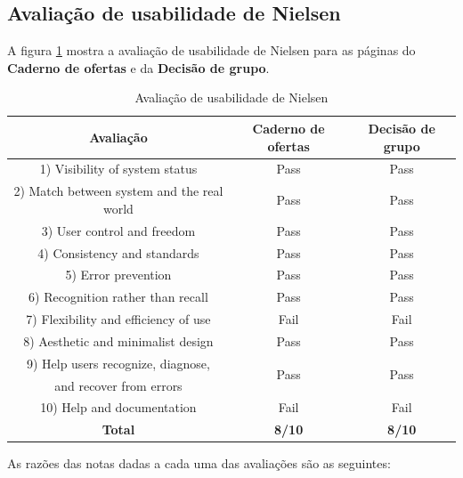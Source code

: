 \subsection{Avaliação de usabilidade de Nielsen}
A figura \ref{tab:NielCad} mostra a avaliação de usabilidade de Nielsen para as páginas do \textbf{Caderno de ofertas} e da \textbf{Decisão de grupo}.
\begin{table}[!htbp]
  \centering
  \caption{Avaliação de usabilidade de Nielsen}
  \begin{tabular}{|c|c|c|}
    \hline
    \textbf{Avaliação} & \textbf{Caderno de ofertas} & \textbf{Decisão de grupo} \\ \hline
    1) Visibility of system status & Pass & Pass \\ \hline
    2) Match between system and the real world & Pass & Pass \\ \hline
    3) User control and freedom & Pass & Pass \\ \hline
    4) Consistency and standards & Pass & Pass\\ \hline
    5) Error prevention & Pass & Pass \\ \hline
    6) Recognition rather than recall & Pass & Pass \\ \hline
    7) Flexibility and efficiency of use & Fail & Fail \\ \hline
    8) Aesthetic and minimalist design & Pass & Pass \\ \hline
    9) Help users recognize, diagnose, & \multirow{2}{*}{Pass} & \multirow{2}{*}{Pass} \\
    and recover from errors & &\\ \hline
    10) Help and documentation & Fail & Fail \\ \hline
    \textbf{Total} & \textbf{8/10} & \textbf{8/10} \\ \hline
  \end{tabular}
  \label{tab:NielCad}
\end{table}

As razões das notas dadas a cada uma das avaliações são as seguintes:

